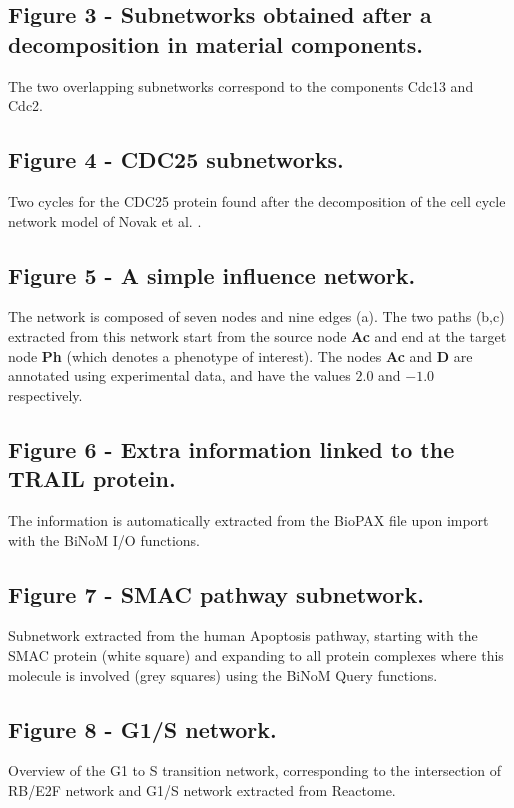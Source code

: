\documentclass[10pt]{bmc_article}
\newenvironment{bmcformat}{\baselineskip20pt\sloppy\setboolean{publ}{false}}{\baselineskip20pt\sloppy}
\begin{document}
\begin{bmcformat}
  \subsection*{Figure 3 - Subnetworks obtained after a decomposition in material components.}
The two overlapping subnetworks correspond to the components Cdc13 and
Cdc2.

  \subsection*{Figure 4 - CDC25 subnetworks.}
Two cycles for the CDC25 protein found after the decomposition of the cell cycle network model of Novak et al. \cite{novak1998model}.

  \subsection*{Figure 5 - A simple influence network.}
The network is composed of seven nodes and nine edges (a). The two paths (b,c)
extracted from this network start from the source node \textbf{Ac} and end at
the target node \textbf{Ph} (which denotes a phenotype of interest). The nodes
\textbf{Ac} and \textbf{D} are annotated using experimental data, and have the
values $2.0$ and $-1.0$ respectively.

  \subsection*{Figure 6 - Extra information linked to the TRAIL protein.}
The information is automatically extracted from the BioPAX file upon
import with the BiNoM I/O functions.

  \subsection*{Figure 7 - SMAC pathway subnetwork.}
Subnetwork extracted from the human Apoptosis pathway, starting with the
SMAC protein (white square) and expanding to all protein complexes where this
molecule is involved (grey squares) using the BiNoM Query functions.

  \subsection*{Figure 8 - G1/S network.}
Overview of the G1 to S transition network, corresponding to the intersection of
RB/E2F network and G1/S network extracted from Reactome.


\end{bmcformat}
\end{document}
